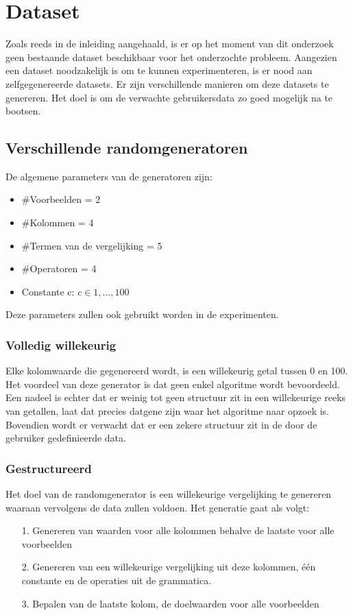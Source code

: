 \documentclass[Main.tex]{subfiles}
\begin{document}
\section{Dataset}

Zoals reeds in de inleiding aangehaald, is er op het moment van dit onderzoek geen bestaande dataset beschikbaar voor het onderzochte probleem. Aangezien een dataset noodzakelijk is om te kunnen experimenteren, is er nood aan zelfgegenereerde datasets. Er zijn verschillende manieren om deze datasets te genereren. Het doel is om de verwachte gebruikersdata zo goed mogelijk na te bootsen.
  
\subsection{Verschillende randomgeneratoren}
De algemene parameters van de generatoren zijn:
\begin{itemize}
\item $\#$Voorbeelden = 2
\item $\#$Kolommen = 4
\item $\#$Termen van de vergelijking = 5
\item $\#$Operatoren = 4
\item Constante c: $ c \in 1,\dotsc,100$ 
\end{itemize}
Deze parameters zullen ook gebruikt worden in de experimenten.

\subsubsection*{Volledig willekeurig}
Elke kolomwaarde die gegenereerd wordt, is een willekeurig getal tussen 0 en 100. Het voordeel van deze generator is dat geen enkel algoritme wordt bevoordeeld. Een nadeel is echter dat er weinig tot geen structuur zit in een willekeurige reeks van getallen, laat dat precies datgene zijn waar het algoritme naar opzoek is. Bovendien wordt er verwacht dat er een zekere structuur zit in de door de gebruiker gedefinieerde data.

\subsubsection*{Gestructureerd}
Het doel van de randomgenerator is een willekeurige vergelijking te genereren waaraan vervolgens de data zullen voldoen.
Het generatie gaat als volgt:
\begin{itemize}
\item[1.] Genereren van waarden voor alle kolommen behalve de laatste voor alle voorbeelden
\item[2.] Genereren van een willekeurige vergelijking uit deze kolommen, \'e\'en constante en de operaties uit de grammatica.
\item[3.] Bepalen van de laatste kolom, de doelwaarden voor alle voorbeelden
\end{itemize}
\end{document}
